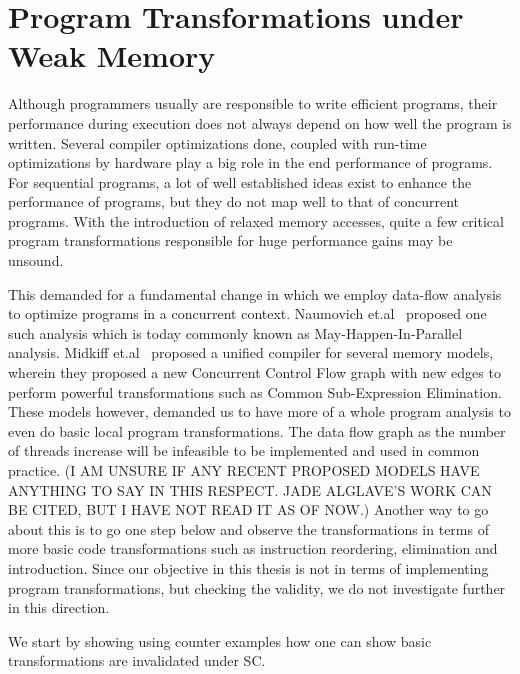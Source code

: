 \section{Program Transformations under Weak Memory}

    Although programmers usually are responsible to write efficient programs, their performance during execution does not always depend on how well the program is written. 
    Several compiler optimizations done, coupled with run-time optimizations by hardware play a big role in the end performance of programs.
    For sequential programs, a lot of well established ideas exist to enhance the performance of programs, but they do not map well to that of concurrent programs. 
    With the introduction of relaxed memory accesses, quite a few critical program transformations responsible for huge performance gains may be unsound. 

    This demanded for a fundamental change in which we employ data-flow analysis to optimize programs in a concurrent context. Naumovich et.al~\cite{NaumovichA} proposed one such analysis which is today commonly known as May-Happen-In-Parallel analysis. 
    Midkiff et.al~\cite{Midkiff} proposed a unified compiler for several memory models, wherein they proposed a new Concurrent Control Flow graph with new edges to perform powerful transformations such as Common Sub-Expression Elimination. 
    These models however, demanded us to have more of a whole program analysis to even do basic local program transformations. 
    The data flow graph as the number of threads increase will be infeasible to be implemented and used in common practice. 
    (I AM UNSURE IF ANY RECENT PROPOSED MODELS HAVE ANYTHING TO SAY IN THIS RESPECT. JADE ALGLAVE'S WORK CAN BE CITED, BUT I HAVE NOT READ IT AS OF NOW.)
    Another way to go about this is to go one step below and observe the transformations in terms of more basic code transformations such as instruction reordering, elimination and introduction. 
    Since our objective in this thesis is not in terms of implementing program transformations, but checking the validity, we do not investigate further in this direction. 
    
    We start by showing using counter examples how one can show basic transformations are invalidated under SC.

